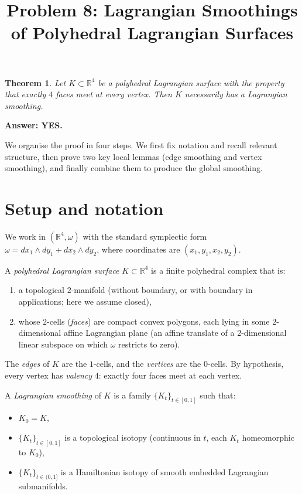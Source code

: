 \documentclass[12pt]{article}
\title{Problem 8: Lagrangian Smoothings of Polyhedral Lagrangian Surfaces}
\author{}
\date{}
\newtheorem{theorem}{Theorem}
\theoremstyle{definition}
\begin{document}
\maketitle

\begin{theorem}
\label{thm:main}
Let $K \subset \mathbb{R}^4$ be a polyhedral Lagrangian surface with the property that exactly $4$ faces meet at every vertex. Then $K$ necessarily has a Lagrangian smoothing.
\end{theorem}

\noindent\textbf{Answer: YES.}

\medskip
We organise the proof in four steps. We first fix notation and recall relevant structure, then prove two key local lemmas (edge smoothing and vertex smoothing), and finally combine them to produce the global smoothing.

\section*{Setup and notation}

We work in $(\mathbb{R}^4, \omega)$ with the standard symplectic form $\omega = dx_1 \wedge dy_1 + dx_2 \wedge dy_2$, where coordinates are $(x_1, y_1, x_2, y_2)$.

A \emph{polyhedral Lagrangian surface} $K \subset \mathbb{R}^4$ is a finite polyhedral complex that is:
\begin{enumerate}
  \item[(i)] a topological $2$-manifold (without boundary, or with boundary in applications; here we assume closed),
  \item[(ii)] whose $2$-cells (\emph{faces}) are compact convex polygons, each lying in some $2$-dimensional affine Lagrangian plane (an affine translate of a $2$-dimensional linear subspace on which $\omega$ restricts to zero).
\end{enumerate}
The \emph{edges} of $K$ are the $1$-cells, and the \emph{vertices} are the $0$-cells. By hypothesis, every vertex has \emph{valency} $4$: exactly four faces meet at each vertex.

A \emph{Lagrangian smoothing} of $K$ is a family $\{K_t\}_{t \in [0,1]}$ such that:
\begin{itemize}
  \item $K_0 = K$,
  \item $\{K_t\}_{t \in [0,1]}$ is a topological isotopy (continuous in $t$, each $K_t$ homeomorphic to $K_0$),
  \item $\{K_t\}_{t \in (0,1]}$ is a Hamiltonian isotopy of smooth embedded Lagrangian submanifolds.
\end{itemize}
\end{document}
